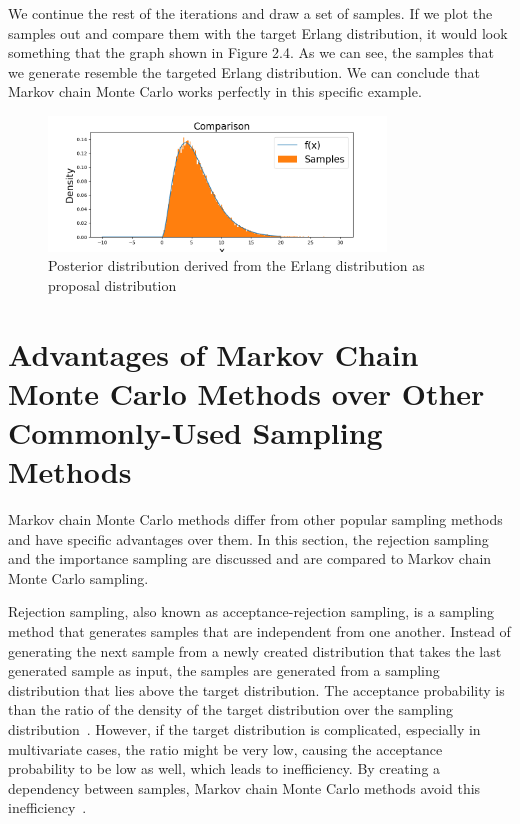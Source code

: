We continue the rest of the iterations and draw a set of samples. If we plot the samples out and compare them with the target Erlang distribution, it would look something that the graph shown in Figure 2.4. As we can see, the samples that we generate resemble the targeted Erlang distribution. We can conclude that Markov chain Monte Carlo works perfectly in this specific example.

\begin{figure}[H]
    \centering
    \includegraphics[width=0.8\textwidth]{figures/mcmc_example/result.png}
    \captionsetup{width=.8\textwidth}
    \caption{Posterior distribution derived from the Erlang distribution as proposal distribution}
    \label{fig:enter-label}
\end{figure}

\section{Advantages of Markov Chain Monte Carlo Methods over Other Commonly-Used Sampling Methods}
Markov chain Monte Carlo methods differ from other popular sampling methods and have specific advantages over them. In this section, the rejection sampling and the importance sampling are discussed and are compared to Markov chain Monte Carlo sampling.

Rejection sampling, also known as acceptance-rejection sampling, is a sampling method that generates samples that are independent from one another. Instead of generating the next sample from a newly created distribution that takes the last generated sample as input, the samples are generated from a sampling distribution that lies above the target distribution. The acceptance probability is than the ratio of the density of the target distribution over the sampling distribution~\cite{mcmc_practice}. However, if the target distribution is complicated, especially in multivariate cases, the ratio might be very low, causing the acceptance probability to be low as well, which leads to inefficiency. By creating a dependency between samples, Markov chain Monte Carlo methods avoid this inefficiency~\cite{ComparisonSampling}.

